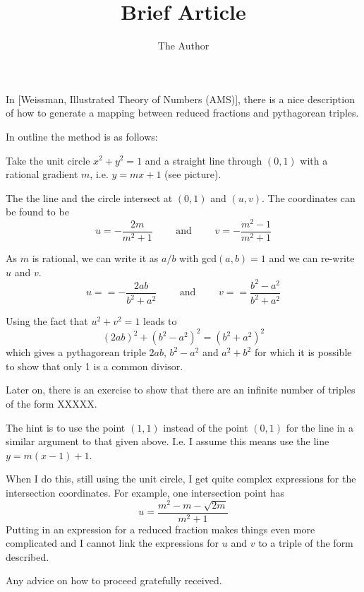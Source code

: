 \documentclass[11pt]{amsart}
\title{Brief Article}
\author{The Author}
\begin{document}


In [Weissman, Illustrated Theory of Numbers (AMS)], there is a nice description of how to generate a mapping between reduced fractions and pythagorean triples.

In outline the method is as follows:

Take the unit circle $x^2+y^2=1$ and a straight line through $(0,1)$ with a rational gradient $m$, i.e. $y = mx + 1$ (see picture).

The the line  and the circle intersect at $(0,1)$ and $(u,v)$. The coordinates can be found to be 
$$
u = -\frac{2 m}{{{m}^{2}}+1} \qquad 
\text{ and }
\qquad
v = -\frac{{{m}^{2}}-1}{{{m}^{2}}+1}
$$

As $m$ is rational, we can write it as $a/b$ with gcd$(a,b)=1$ and we can re-write $u$ and $v$.
$$
u = =-\frac{2 a b}{{{b}^{2}}+{{a}^{2}}}
\qquad 
\text{ and }
\qquad
v = =\frac{{{b}^{2}}-{{a}^{2}}}{{{b}^{2}}+{{a}^{2}}}
$$

Using the fact that $u^2+v^2 = 1$ leads to
$$
(2ab)^2 + (b^2-a^2)^2 = (b^2 + a^2)^2
$$
which gives a pythagorean triple $2ab$, $b^2-a^2$ and $a^2+b^2$ for which it is possible to show that only 1 is a common divisor.

Later on, there is an exercise to show that there are an infinite number of triples of the form XXXXX.

The hint is to use the point $(1,1)$ instead of the point $(0,1)$ for the line in a similar argument to that given above. I.e. I assume this means use the line $y = m(x-1) + 1$.

When I do this, still using the unit circle, I get quite complex expressions for the intersection coordinates. For example, one intersection point has
\[u = \frac{{{m}^{2}} - m -  \sqrt{2m}}{{{m}^{2}}+1}\]
Putting in an expression for a reduced fraction makes things even more complicated and I cannot link the expressions for $u$ and $v$ to a triple of the form described.

Any advice on how to proceed gratefully received.
\end{document}
